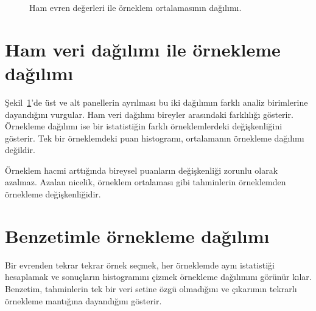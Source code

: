 \begin{figure}[H]
\centering
{}
\caption{Ham evren değerleri ile örneklem ortalamasının dağılımı.}
\label{fig:raw-vs-sampling}
\end{figure}

\section{Ham veri dağılımı ile örnekleme dağılımı}

Şekil~\ref{fig:raw-vs-sampling}'de üst ve alt panellerin ayrılması bu iki
dağılımın farklı analiz birimlerine dayandığını vurgular. Ham veri dağılımı
bireyler arasındaki farklılığı gösterir. Örnekleme dağılımı
ise bir istatistiğin farklı örneklemlerdeki değişkenliğini gösterir. Tek bir
örneklemdeki puan histogramı, ortalamanın örnekleme dağılımı değildir.

\begin{mistakebox}
Örneklem hacmi arttığında bireysel puanların değişkenliği zorunlu olarak
azalmaz. Azalan nicelik, örneklem ortalaması gibi tahminlerin örneklemden
örnekleme değişkenliğidir.
\end{mistakebox}

\section{Benzetimle örnekleme dağılımı}
\label{sec:sampling-simulation}

Bir evrenden tekrar tekrar örnek seçmek, her örneklemde aynı istatistiği
hesaplamak ve sonuçların histogramını çizmek örnekleme dağılımını görünür
kılar. Benzetim, tahminlerin tek bir veri setine özgü olmadığını ve çıkarımın
tekrarlı örnekleme mantığına dayandığını gösterir.


